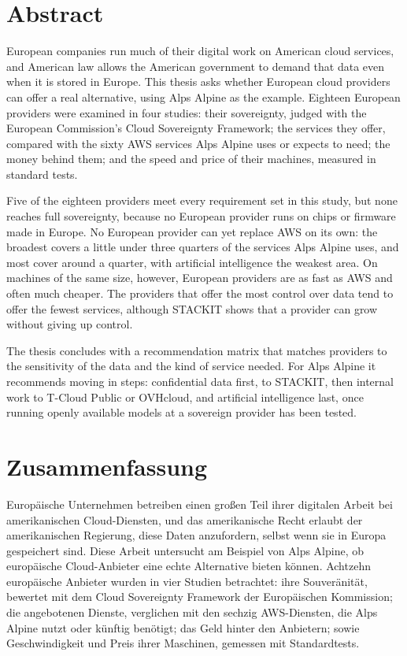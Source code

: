 \chapter*{Abstract}

European companies run much of their digital work on American cloud services, and
American law allows the American government to demand that data even when it is
stored in Europe. This thesis asks whether European cloud providers can offer a
real alternative, using Alps Alpine as the example. Eighteen European providers were
examined in four studies: their sovereignty, judged with the European Commission's
Cloud Sovereignty Framework; the services they offer, compared with the sixty
\acs{AWS} services Alps Alpine uses or expects to need; the money behind them; and
the speed and price of their machines, measured in standard tests.

Five of the eighteen providers meet every requirement set in this study, but none
reaches full sovereignty, because no European provider runs on chips or firmware made
in Europe. No European provider can yet replace \acs{AWS} on its own: the broadest
covers a little under three quarters of the services Alps Alpine uses, and most cover
around a quarter, with artificial intelligence the weakest area. On machines of the
same size, however, European providers are as fast as \acs{AWS} and often much
cheaper. The providers that offer the most control over data tend to offer the
fewest services, although STACKIT shows that a provider can grow without giving up
control.

The thesis concludes with a recommendation matrix that matches providers to the
sensitivity of the data and the kind of service needed. For Alps Alpine it
recommends moving in steps: confidential data first, to STACKIT, then internal work
to T-Cloud Public or OVHcloud, and artificial intelligence last, once running
openly available models at a sovereign provider has been tested.

\chapter*{Zusammenfassung}

Europäische Unternehmen betreiben einen großen Teil ihrer digitalen Arbeit bei
amerikanischen Cloud-Diensten, und das amerikanische Recht erlaubt der
amerikanischen Regierung, diese Daten anzufordern, selbst wenn sie in Europa
gespeichert sind. Diese Arbeit untersucht am Beispiel von Alps Alpine, ob
europäische Cloud-Anbieter eine echte Alternative bieten können. Achtzehn europäische
Anbieter wurden in vier Studien betrachtet: ihre Souveränität, bewertet mit dem Cloud
Sovereignty Framework der Europäischen Kommission; die angebotenen Dienste, verglichen
mit den sechzig \acs{AWS}-Diensten, die Alps Alpine nutzt oder künftig benötigt; das
Geld hinter den Anbietern; sowie Geschwindigkeit und Preis ihrer Maschinen, gemessen
mit Standardtests.


